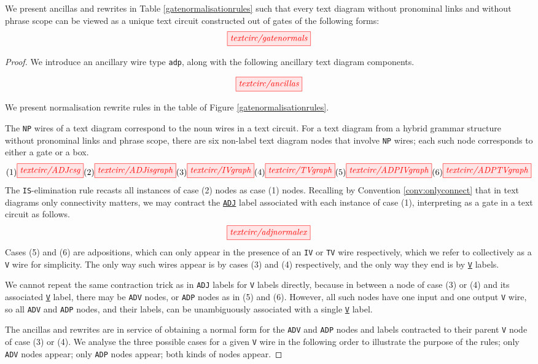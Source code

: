 \begin{lemma}\label{lem:gatenorm}
We present ancillas and rewrites in Table \ref{gatenormalisationrules} such that every text diagram without pronominal links and without phrase scope can be viewed as a unique text circuit constructed out of gates of the following forms:
\[\tikzfig{textcirc/gatenormals}\]
\begin{proof}

We introduce an ancillary wire type \texttt{adp}, along with the following ancillary text diagram components.

\[\tikzfig{textcirc/ancillas}\]

We present normalisation rewrite rules in the table of Figure \ref{gatenormalisationrules}.

The \texttt{NP} wires of a text diagram correspond to the noun wires in a text circuit. For a text diagram from a hybrid grammar structure without pronominal links and phrase scope, there are six non-label text diagram nodes that involve \texttt{NP} wires; each such node corresponds to either a gate or a box.
\[(1) \tikzfig{textcirc/ADJcsg} (2) \tikzfig{textcirc/ADJisgraph} (3) \tikzfig{textcirc/IVgraph} (4) \tikzfig{textcirc/TVgraph} (5) \tikzfig{textcirc/ADPIVgraph} (6) \tikzfig{textcirc/ADPTVgraph}\]
The \texttt{IS}-elimination rule recasts all instances of case (2) nodes as case (1) nodes. Recalling by Convention \ref{conv:onlyconnect} that in text diagrams only connectivity matters, we may contract the \texttt{\underline{ADJ}} label associated with each instance of case (1), interpreting as a gate in a text circuit as follows.
\[\tikzfig{textcirc/adjnormalex}\]
Cases (5) and (6) are adpositions, which can only appear in the presence of an \texttt{IV} or \texttt{TV} wire respectively, which we refer to collectively as a \texttt{V} wire for simplicity. The only way such wires appear is by cases (3) and (4) respectively, and the only way they end is by \texttt{\underline{V}} labels.

We cannot repeat the same contraction trick as in \texttt{ADJ} labels for \texttt{V} labels directly, because in between a node of case (3) or (4) and its associated \texttt{\underline{V}} label, there may be \texttt{ADV} nodes, or \texttt{ADP} nodes as in (5) and (6). However, all such nodes have one input and one output \texttt{V} wire, so all \texttt{ADV} and \texttt{ADP} nodes, and their labels, can be unambiguously associated with a single \texttt{\underline{V}} label.

The ancillas and rewrites are in service of obtaining a normal form for the \texttt{ADV} and \texttt{ADP} nodes and labels contracted to their parent \texttt{V} node of case (3) or (4). We analyse the three possible cases for a given \texttt{V} wire in the following order to illustrate the purpose of the rules; only \texttt{ADV} nodes appear; only \texttt{ADP} nodes appear; both kinds of nodes appear.


\end{proof}
\end{lemma}
